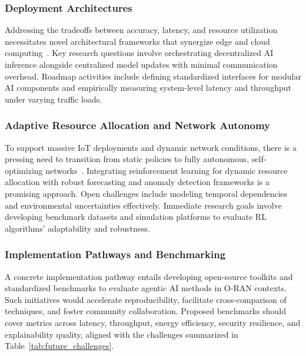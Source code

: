 \documentclass[sigconf]{acmart}
\begin{document}
\subsubsection{Deployment Architectures}
Addressing the tradeoffs between accuracy, latency, and resource utilization necessitates novel architectural frameworks that synergize edge and cloud computing~\cite{ref50}. Key research questions involve orchestrating decentralized AI inference alongside centralized model updates with minimal communication overhead. Roadmap activities include defining standardized interfaces for modular AI components and empirically measuring system-level latency and throughput under varying traffic loads.

\subsubsection{Adaptive Resource Allocation and Network Autonomy}
To support massive IoT deployments and dynamic network conditions, there is a pressing need to transition from static policies to fully autonomous, self-optimizing networks~\cite{ref21}. Integrating reinforcement learning for dynamic resource allocation with robust forecasting and anomaly detection frameworks is a promising approach. Open challenges include modeling temporal dependencies and environmental uncertainties effectively. Immediate research goals involve developing benchmark datasets and simulation platforms to evaluate RL algorithms’ adaptability and robustness.

\subsubsection{Implementation Pathways and Benchmarking}
A concrete implementation pathway entails developing open-source toolkits and standardized benchmarks to evaluate agentic AI methods in O-RAN contexts. Such initiatives would accelerate reproducibility, facilitate cross-comparison of techniques, and foster community collaboration. Proposed benchmarks should cover metrics across latency, throughput, energy efficiency, security resilience, and explainability quality, aligned with the challenges summarized in Table~\ref{tab:future_challenges}.
\end{document}
